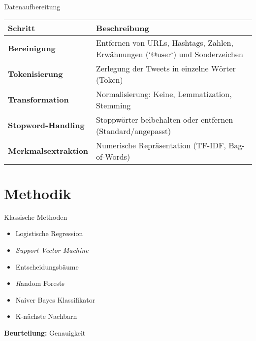 \documentclass[aspectratio=169]{beamer} %
\begin{document}
\begin{frame}{Datenaufbereitung}
  \fontsize{10pt}{12pt}\selectfont %
  \vspace{0.3cm}

  \begin{table}[]
      \centering
      \renewcommand{\arraystretch}{1.1}
      \begin{tabular}{l|p{5.8cm}}
          \hline
          \textbf{Schritt} & \textbf{Beschreibung} \\
          \hline
          \textbf{Bereinigung} & Entfernen von URLs, Hashtags, Zahlen, Erwähnungen (`@user`) und Sonderzeichen \\
          \hline
          \textbf{Tokenisierung} & Zerlegung der Tweets in einzelne Wörter (Token) \\
          \hline
          \textbf{Transformation} & Normalisierung: Keine, Lemmatization, Stemming \\
          \hline
          \textbf{Stopword-Handling} & Stoppwörter beibehalten oder entfernen (Standard/angepasst) \\
          \hline
          \textbf{Merkmalsextraktion} & Numerische Repräsentation (TF-IDF, Bag-of-Words) \\
          \hline
      \end{tabular}
  \end{table}

\end{frame}
\section{Methodik}

\begin{frame}{Klassische Methoden}
  \Large
  \begin{itemize}
      \item Logistische Regression
      \item \textit{Support Vector Machine}
      \item Entscheidungsbäume
      \item \textit Random Forests
      \item Naiver Bayes Klassifikator
      \item K-nächste Nachbarn
  \end{itemize}

  \vspace{0.5cm}
  \textbf{Beurteilung:} Genauigkeit
\end{frame}
\end{document}
